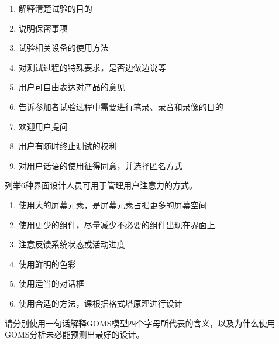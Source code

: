 \begin{solution}
\vspace{-0.8em}
\begin{multicols}{2}
    \begin{enumerate}[label=\arabic*.]
        \item 解释清楚试验的目的
        \item 说明保密事项
        \item 试验相关设备的使用方法
        \item 对测试过程的特殊要求，是否边做边说等
        \item 用户可自由表达对产品的意见
        \item 告诉参加者试验过程中需要进行笔录、录音和录像的目的
        \item 欢迎用户提问
        \item 用户有随时终止测试的权利 
        \item 对用户话语的使用征得同意，并选择匿名方式
    \end{enumerate}
\end{multicols}
\vspace{-1em}
\end{solution}



\begin{problem}[2013]
列举6种界面设计人员可用于管理用户注意力的方式。
\end{problem}

\begin{solution}
\vspace{-0.8em}
\begin{multicols}{2}
    \begin{enumerate}[label=\arabic*.]
        \item 使用大的屏幕元素，是屏幕元素占据更多的屏幕空间
        \item 使用更少的组件，尽量减少不必要的组件出现在界面上
        \item 注意反馈系统状态或活动进度
        \item 使用鲜明的色彩
        \item 使用适当的对话框
        \item 使用合适的方法，课根据格式塔原理进行设计
    \end{enumerate}
\end{multicols}
\vspace{-1em}
\end{solution}



\begin{problem}[2012、2013]
请分别使用一句话解释GOMS模型四个字母所代表的含义，以及为什么使用GOMS分析未必能预测出最好的设计。
\end{problem}


